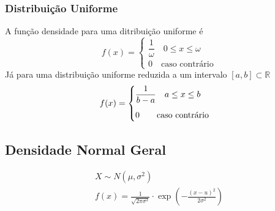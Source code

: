 \documentclass{article}
\begin{document}
\subsubsection{Distribuição Uniforme}
A função densidade para uma ditribuição uniforme é
\[
  f(x) = \begin{cases}
          \dfrac{1}{\omega} \quad 0 \leq x \leq \omega \\[10pt]
          0 \quad \text{caso contrário}
         \end{cases}
\]
Já para uma distribuição uniforme reduzida a um intervalo $[a,b] \subset \mathbb{R}$
\[
  f(x) = \begin{cases}
          \dfrac{1}{b - a} \quad a \leq x \leq b \\[10pt]
          0 \qquad \text{caso contrário}
         \end{cases} \\[10pt]
\]

\pagebreak


\subsection{Densidade Normal Geral}
\begin{gather*}
  X \sim N(\mu, \sigma^2) \\[5pt]
  f(x) = \frac{1}{\sqrt{2 \pi \sigma^2}} \cdot \exp \left(- \frac{{(x - u)}^2}{2\sigma^2} \right)
\end{gather*}
\end{document}
